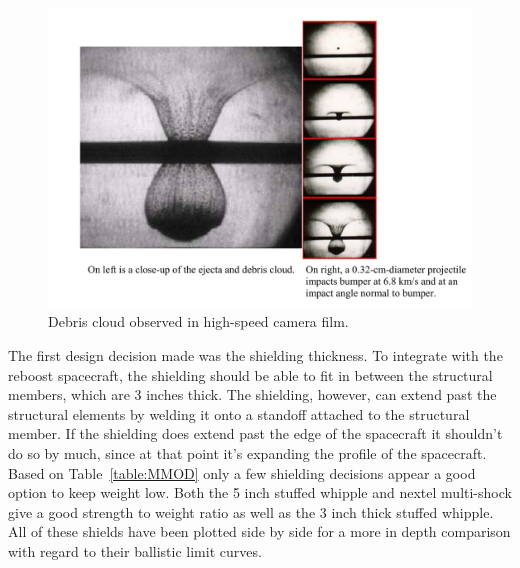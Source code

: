 \documentclass[paper=letter, fontsize=11pt]{scrartcl} %
\numberwithin{equation}{section} %
\numberwithin{figure}{section} %
\numberwithin{table}{section} %
\begin{document}
\begin{figure}[H]
	\begin{center}
	\includegraphics[width=5in]{plume.png}
	\caption{Debris cloud observed in high-speed camera film.}
	\label{fig:plume}
	\end{center}
\end{figure}

The first design decision made was the shielding thickness. To integrate with the reboost spacecraft, the shielding should be able to fit in between the structural members, which are 3 inches thick. The shielding, however, can extend past the structural elements by welding it onto a standoff attached to the structural member. If the shielding does extend past the edge of the spacecraft it shouldn't do so by much, since at that point it's expanding the profile of the spacecraft. Based on Table~\ref{table:MMOD} only a few shielding decisions appear a good option to keep weight low. Both the 5 inch stuffed whipple and nextel multi-shock give a good strength to weight ratio as well as the 3 inch thick stuffed whipple. All of these shields have been plotted side by side for a more in depth comparison with regard to their ballistic limit curves.
\end{document}
